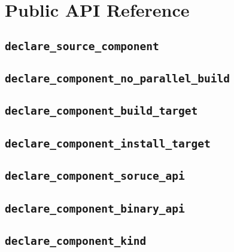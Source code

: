 %
%
%
%
\chapter{Public API Reference}
\section{\texttt{declare\_source\_component}}

\section{\texttt{declare\_component\_no\_parallel\_build}}\label{api:declare-component-no-parallel-build}
\section{\texttt{declare\_component\_build\_target}}\label{api:declare-component-build-target}
\section{\texttt{declare\_component\_install\_target}}\label{api:declare-component-install-target}
\section{\texttt{declare\_component\_soruce\_api}}\label{api:declare-component-source-api}
\section{\texttt{declare\_component\_binary\_api}}\label{api:declare-component-binary-api}
\section{\texttt{declare\_component\_kind}}\label{api:declare-component-kind}
